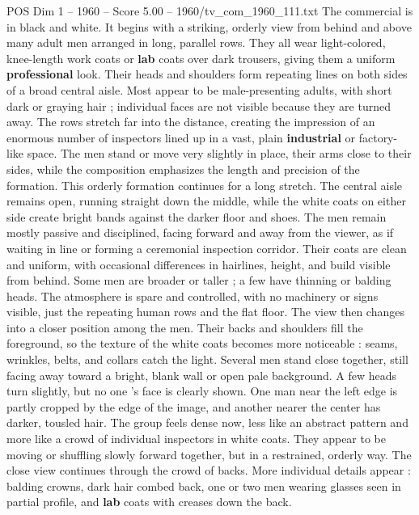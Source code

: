 \begin{textsample}{POS Dim 1 – 1960 – Score 5.00 – 1960/tv\_com\_1960\_111.txt}  \label{ex:f1_pos_077}
The commercial is in black and white.
It begins with a striking, orderly view from behind and above many adult men arranged in long, parallel rows.
They all wear light-colored, knee-length work coats or \textbf{lab} coats over dark trousers, giving them a uniform \textbf{professional} look.
Their heads and shoulders form repeating lines on both sides of a broad central aisle.
Most appear to be male-presenting adults, with short dark or graying hair ; individual faces are not visible because they are turned away.
The rows stretch far into the distance, creating the impression of an enormous number of inspectors lined up in a vast, plain \textbf{industrial} or factory-like space.
The men stand or move very slightly in place, their arms close to their sides, while the composition emphasizes the length and precision of the formation.
This orderly formation continues for a long stretch.
The central aisle remains open, running straight down the middle, while the white coats on either side create bright bands against the darker floor and shoes.
The men remain mostly passive and disciplined, facing forward and away from the viewer, as if waiting in line or forming a ceremonial inspection corridor.
Their coats are clean and uniform, with occasional differences in hairlines, height, and build visible from behind.
Some men are broader or taller ; a few have thinning or balding heads.
The atmosphere is spare and controlled, with no machinery or signs visible, just the repeating human rows and the flat floor.
The view then changes into a closer position among the men.
Their backs and shoulders fill the foreground, so the texture of the white coats becomes more noticeable : seams, wrinkles, belts, and collars catch the light.
Several men stand close together, still facing away toward a bright, blank wall or open pale background.
A few heads turn slightly, but no one ’s face is clearly shown.
One man near the left edge is partly cropped by the edge of the image, and another nearer the center has darker, tousled hair.
The group feels dense now, less like an abstract pattern and more like a crowd of individual inspectors in white coats.
They appear to be moving or shuffling slowly forward together, but in a restrained, orderly way.
The close view continues through the crowd of backs.
More individual details appear : balding crowns, dark hair combed back, one or two men wearing glasses seen in partial profile, and \textbf{lab} coats with creases down the back.

\end{textsample}
